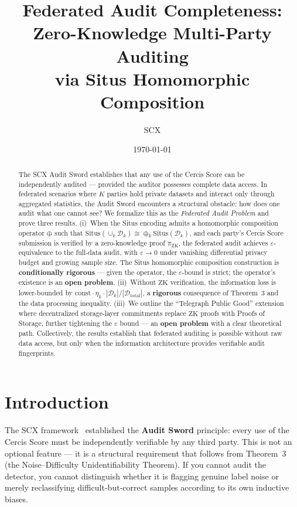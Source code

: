 \documentclass[12pt,a4paper]{article}
\title{\bfseries Federated Audit Completeness:\\
Zero-Knowledge Multi-Party Auditing\\
via Situs Homomorphic Composition}
\author{SCX}
\date{\today}
\newcommand{\cD}{\mathcal{D}}
\newcommand{\Situs}{\mathrm{Situs}}
\newcommand{\ZK}{\mathrm{ZK}}
\begin{document}
\maketitle

\begin{abstract}
The \textsf{SCX} Audit Sword establishes that any use of the Cercis Score can be
independently audited --- provided the auditor possesses complete data access.
In federated scenarios where $K$ parties hold private datasets and interact
only through aggregated statistics, the Audit Sword encounters a structural
obstacle: how does one audit what one cannot see?  We formalize this as the
\emph{Federated Audit Problem} and prove three results.  (i)~When the Situs
encoding admits a homomorphic composition operator $\oplus$ such that
$\Situs(\cup_k \cD_k) \cong \oplus_k \Situs(\cD_k)$, and each party's Cercis
Score submission is verified by a zero-knowledge proof $\pi_{\ZK}$, the
federated audit achieves $\varepsilon$-equivalence to the full-data audit,
with $\varepsilon \to 0$ under vanishing differential privacy budget and
growing sample size.  The Situs homomorphic composition construction is
\textbf{conditionally rigorous} --- given the operator, the $\varepsilon$-bound
is strict; the operator's existence is an \textbf{open problem}.
(ii)~Without $\ZK$ verification, the information loss is lower-bounded by
$\mathrm{const} \cdot \eta_k \cdot |\cD_k|/|\cD_{\mathrm{total}}|$, a
\textbf{rigorous} consequence of Theorem~3 and the data processing inequality.
(iii)~We outline the ``Telegraph Public Good'' extension where decentralized
storage-layer commitments replace $\ZK$ proofs with Proofs of Storage,
further tightening the $\varepsilon$ bound --- an \textbf{open problem} with
a clear theoretical path.  Collectively, the results establish that federated
auditing is possible without raw data access, but only when the information
architecture provides verifiable audit fingerprints.
\end{abstract}

\section{Introduction}

The \textsf{SCX} framework~\citep{scx2024cercis} established the \textbf{Audit Sword}
principle: every use of the Cercis Score must be independently verifiable by
any third party.  This is not an optional feature --- it is a structural
requirement that follows from Theorem~3 (the Noise--Difficulty
Unidentifiability Theorem).  If you cannot audit the detector, you cannot
distinguish whether it is flagging genuine label noise or merely reclassifying
difficult-but-correct samples according to its own inductive biases.
\end{document}
